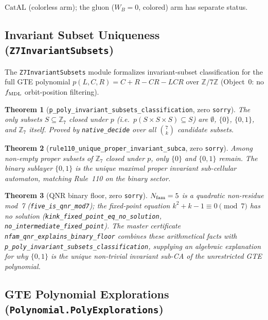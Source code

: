 \documentclass[11pt,a4paper]{article}
\newtheorem{theorem}{Theorem}[section]
\theoremstyle{definition}
\newcommand{\CatAL}{\ensuremath{\mathrm{CatAL}}}
\begin{document}
$\CatAL$ (colorless arm); the gluon ($W_B=0$,
colored) arm has separate status.

\subsection{Invariant Subset Uniqueness (\texttt{Z7InvariantSubsets})}\label{subsec:z7-invariant-subsets}

The \texttt{Z7InvariantSubsets} module formalizes invariant-subset classification for
the full GTE polynomial $p(L,C,R) = C + R - CR - LCR$ over $\mathbb{Z}/7\mathbb{Z}$
(Object~0: no $f_{\rm MDL}$ orbit-position filtering).

\begin{theorem}[\lstinline|p_poly_invariant_subsets_classification|, zero \texttt{sorry}]
The only subsets $S \subseteq \mathbb{Z}_7$ closed under $p$ (i.e.\ $p(S\times S\times S)\subseteq S$)
are $\emptyset$, $\{0\}$, $\{0,1\}$, and $\mathbb{Z}_7$ itself.
Proved by \lstinline|native_decide| over all $\binom{7}{k}$ candidate subsets.
\end{theorem}

\begin{theorem}[\lstinline|rule110_unique_proper_invariant_subca|, zero \texttt{sorry}]
Among non-empty proper subsets of $\mathbb{Z}_7$ closed under $p$, only $\{0\}$ and
$\{0,1\}$ remain.  The binary sublayer $\{0,1\}$ is the unique maximal proper
invariant sub-cellular automaton, matching Rule~110 on the binary sector.
\end{theorem}

\begin{theorem}[QNR binary floor, zero \texttt{sorry}]
$N_{\rm fam} = 5$ is a quadratic non-residue mod~7
(\lstinline|five_is_qnr_mod7|); the fixed-point equation $k^2+k-1\equiv 0\pmod 7$
has no solution (\lstinline|kink_fixed_point_eq_no_solution|,
\lstinline|no_intermediate_fixed_point|).
The master certificate \lstinline|nfam_qnr_explains_binary_floor| combines these
arithmetical facts with \lstinline|p_poly_invariant_subsets_classification|,
supplying an algebraic explanation for why $\{0,1\}$ is the unique non-trivial
invariant sub-CA of the unrestricted GTE polynomial.
\end{theorem}

\subsection{GTE Polynomial Explorations (\texttt{Polynomial.PolyExplorations})}\label{subsec:poly-explorations}
\end{document}
